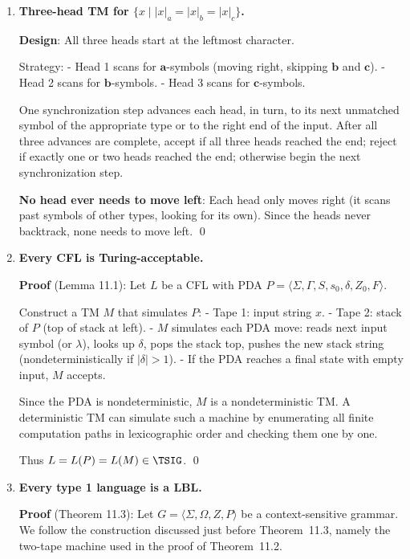 \begin{enumerate}[{11.}1. ]
\item \textbf{Three-head TM for $\{x \mid |x|_a = |x|_b = |x|_c\}$.}

\textbf{Design}: All three heads start at the leftmost character.

Strategy:
- Head 1 scans for $\pmb{a}$-symbols (moving right, skipping $\pmb{b}$ and $\pmb{c}$).
- Head 2 scans for $\pmb{b}$-symbols.
- Head 3 scans for $\pmb{c}$-symbols.

One synchronization step advances each head, in turn, to its next unmatched
symbol of the appropriate type or to the right end of the input. After all three
advances are complete, accept if all three heads reached the end; reject if
exactly one or two heads reached the end; otherwise begin the next
synchronization step.

\textbf{No head ever needs to move left}: Each head only moves right (it scans past symbols of other types, looking for its own). Since the heads never backtrack, none needs to move left. \qed

\item \textbf{Every CFL is Turing-acceptable.}

\textbf{Proof} (Lemma 11.1): Let $L$ be a CFL with PDA $P = \langle\Sigma,\Gamma,S,s_0,\delta,Z_0,F\rangle$.

Construct a TM $M$ that simulates $P$:
- Tape 1: input string $x$.
- Tape 2: stack of $P$ (top of stack at left).
- $M$ simulates each PDA move: reads next input symbol (or $\lambda$), looks up $\delta$, pops the stack top, pushes the new stack string (nondeterministically if $|\delta|>1$).
- If the PDA reaches a final state with empty input, $M$ accepts.

Since the PDA is nondeterministic, $M$ is a nondeterministic TM. A deterministic
TM can simulate such a machine by enumerating all finite computation paths in
lexicographic order and checking them one by one.

Thus $L = L(P) = L(M) \in \TSIG$. \qed

\item \textbf{Every type 1 language is a LBL.}

\textbf{Proof} (Theorem 11.3): Let $G=\langle\Sigma,\Omega,Z,P\rangle$ be a
context-sensitive grammar. We follow the construction discussed just before
Theorem~11.3, namely the two-tape machine used in the proof of
Theorem~11.2.


\end{enumerate}
